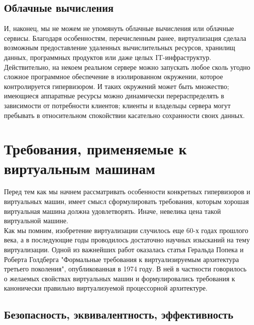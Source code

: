 \documentclass[14pt, a4paper]{article}
\begin{document}
\subsection*{Облачные вычисления}

И, наконец, мы не можем не упомянуть облачные вычисления или облачные сервисы.
Благодаря особенностям, перечисленным ранее, виртуализация сделала возможным
предоставление удаленных вычислительных ресурсов, хранилищ данных,
программных продуктов или даже целых IT-инфраструктур. Действительно, на некоем
реальном сервере можно запускать любое сколь угодно сложное программное
обеспечение в изолированном окружении, которое контролируется гипервизором. И таких окружений может быть множество; имеющиеся аппаратные ресурсы можно
динамически перераспределять в зависимости от потребности клиентов; клиенты и
владельцы сервера могут пребывать в относительном спокойствии касательно
сохранности своих данных.

\section*{Требования, применяемые к виртуальным машинам}

Перед тем как мы начнем рассматривать особенности конкретных гипервизоров и
виртуальных машин, имеет смысл сформулировать требования, которым хорошая
виртуальная машина должна удовлетворять. Иначе, невелика цена такой виртуальной
машине.\\

Как мы помним, изобретение виртуализации случилось еще 60-х годах прошлого века,
а в последующие годы проводилось достаточно научных изысканий на тему
виртуализации. Одной из важнейших работ оказалась статья Геральда Попека и
Роберта Голдберга "Формальные требования к виртуализируемым архитектура
третьего поколения", опубликованная в 1974 году. В ней в частности говорилось о
желаемых свойствах виртуальных машин и формулировались требования к
канонически правильно виртуализуемой процессорной архитектуре.

\subsection*{Безопасность, эквивалентность, эффективность}
\end{document}
